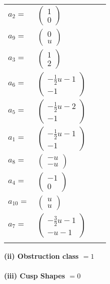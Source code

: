 \documentclass[1p]{elsarticle_modified}
\theoremstyle{definition}
\begin{document}
\begin{tabular}{m{7pt} m{180pt} m{7pt} m{180pt} }
\flushright $a_{2}=$&$\begin{pmatrix}1\\0\end{pmatrix}$ \\
\flushright $a_{9}=$&$\begin{pmatrix}0\\u\end{pmatrix}$ \\
\flushright $a_{3}=$&$\begin{pmatrix}1\\2\end{pmatrix}$ \\
\flushright $a_{6}=$&$\begin{pmatrix}-\frac{1}{2} u-1\\-1\end{pmatrix}$ \\
\flushright $a_{5}=$&$\begin{pmatrix}-\frac{1}{2} u-2\\-1\end{pmatrix}$ \\
\flushright $a_{1}=$&$\begin{pmatrix}-\frac{1}{2} u-1\\-1\end{pmatrix}$ \\
\flushright $a_{8}=$&$\begin{pmatrix}- u\\- u\end{pmatrix}$ \\
\flushright $a_{4}=$&$\begin{pmatrix}-1\\0\end{pmatrix}$ \\
\flushright $a_{10}=$&$\begin{pmatrix}u\\u\end{pmatrix}$ \\
\flushright $a_{7}=$&$\begin{pmatrix}-\frac{3}{2} u-1\\- u-1\end{pmatrix}$\\&\end{tabular}
\flushleft \textbf{(ii) Obstruction class $= 1$}\\~\\
\flushleft \textbf{(iii) Cusp Shapes $= 0$}\\~\\
\end{document}
